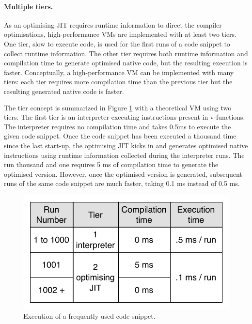 \documentclass[a4paper,12pt,twoside]{../includes/ThesisStyle}
\begin{document}
\paragraph{Multiple tiers.} As an optimising JIT requires runtime information to direct the compiler optimisations, high-performance VMs are implemented with at least two tiers. One tier, slow to execute code, is used for the first runs of a code snippet to collect runtime information. The other tier requires both runtime information and compilation time to generate optimised native code, but the resulting execution is faster. Conceptually, a high-performance VM can be implemented with many tiers: each tier requires more compilation time than the previous tier but the resulting generated native code is faster.

The tier concept is summarized in Figure \ref{fig:GeneralTieredArchitecture} with a theoretical VM using two tiers. The first tier is an interpreter executing instructions present in v-functions. The interpreter requires no compilation time and takes 0.5ms to execute the given code snippet. Once the code snippet has been executed a thousand time since the last start-up, the optimising JIT kicks in and generates optimised native instructions using runtime information collected during the interpreter runs. The run thousand and one requires 5 ms of compilation time to generate the optimised version. However, once the optimised version is generated, subsequent runs of the same code snippet are much faster, taking 0.1 ms instead of 0.5 ms.

\begin{figure}[h!]
    \begin{center}
        \includegraphics[width=0.5\linewidth]{GeneralTieredArchitecture}
        \caption{Execution of a frequently used code snippet.}
        \label{fig:GeneralTieredArchitecture}
    \end{center}
\end{figure}
\end{document}
